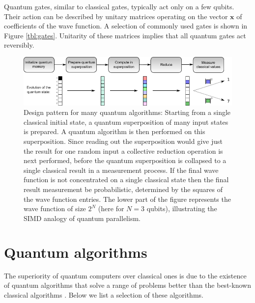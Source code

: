 \documentclass[journal]{IEEEtran}
\begin{document}
Quantum gates, similar to classical gates, typically act only on a few qubits. Their action can be described by unitary matrices operating on the vector $\mathbf{x}$ of coefficients of the wave function. A selection of commonly used gates is shown in Figure \ref{tbl:gates}. 
Unitarity of these matrices implies that all quantum gates act reversibly.
\begin{figure}[t]
\centering
\includegraphics[width=\textwidth]{figures/simd}
\caption{Design pattern for many quantum algorithms: Starting from a single classical initial state, a quantum superposition of many input states is prepared.  A quantum algorithm is then performed on this superposition. Since reading out the superposition would give just the result for one random input a collective reduction operation is next performed, before the quantum superposition is collapsed to a single classical result in a measurement process. If the final wave function is not concentrated on a single classical state then the final result measurement be probabilistic, determined by the squares of the wave function entries.  The lower part of the figure represents the wave function of size $2^N$ (here for $N=3$ qubits), illustrating the SIMD analogy of quantum parallelism. }
\label{fig:simd}
\end{figure}



\section{Quantum algorithms}
\label{sec:box2}
The superiority of quantum computers over classical ones is due to the existence of quantum algorithms that solve a range of problems  better than the best-known classical algorithms \cite{jordan2011quantum}. Below we list a selection of these algorithms.
\end{document}
